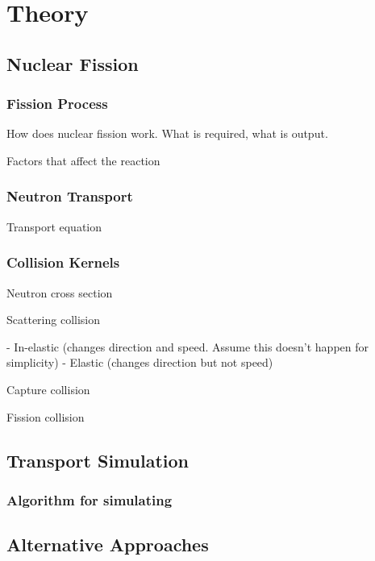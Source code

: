 

\section{Theory}

\subsection{Nuclear Fission}

\subsubsection{Fission Process}

How does nuclear fission work. What is required, what is output.

Factors that affect the reaction

\subsubsection{Neutron Transport}

Transport equation



\subsubsection{Collision Kernels}

Neutron cross section

Scattering collision

- In-elastic (changes direction and speed. Assume this doesn't happen for simplicity)
- Elastic (changes direction but not speed)

Capture collision

Fission collision

\subsection{Transport Simulation}

\subsubsection{Algorithm for simulating}

\subsection{Alternative Approaches}

